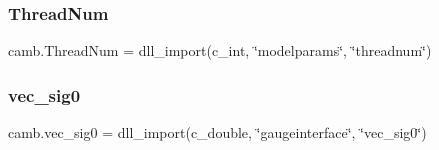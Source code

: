\mbox{\label{namespacecamb_a8dcf37e78d4e08b70f90002000e746b8}} 
\subsubsection{\texorpdfstring{Thread\+Num}{ThreadNum}}
{\footnotesize\ttfamily camb.\+Thread\+Num = dll\+\_\+import(c\+\_\+int, \char`\"{}modelparams\char`\"{}, \char`\"{}threadnum\char`\"{})}

\mbox{\label{namespacecamb_a2e33f06925cf79f62b6d07d7c737217c}} 
\subsubsection{\texorpdfstring{vec\+\_\+sig0}{vec\_sig0}}
{\footnotesize\ttfamily camb.\+vec\+\_\+sig0 = dll\+\_\+import(c\+\_\+double, \char`\"{}gaugeinterface\char`\"{}, \char`\"{}vec\+\_\+sig0\char`\"{})}


